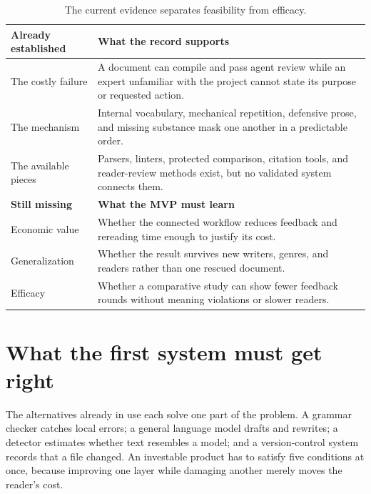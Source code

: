 \begin{table}[H]
\centering
\small
\begin{tabularx}{\textwidth}{@{}p{}L@{}}
\toprule
\textbf{Already established} & \textbf{What the record supports} \\
\midrule
The costly failure & A document can compile and pass agent review while an expert unfamiliar with the project cannot state its purpose or requested action. \\
The mechanism & Internal vocabulary, mechanical repetition, defensive prose, and missing substance mask one another in a predictable order. \\
The available pieces & Parsers, linters, protected comparison, citation tools, and reader-review methods exist, but no validated system connects them. \\
\midrule
\textbf{Still missing} & \textbf{What the MVP must learn} \\
\midrule
Economic value & Whether the connected workflow reduces feedback and rereading time enough to justify its cost. \\
Generalization & Whether the result survives new writers, genres, and readers rather than one rescued document. \\
Efficacy & Whether a comparative study can show fewer feedback rounds without meaning violations or slower readers. \\
\bottomrule
\end{tabularx}
\caption{The current evidence separates feasibility from efficacy.}
\label{tab:opening-status}
\end{table}

\section{What the first system must get right}

The alternatives already in use each solve one part of the problem. A grammar
checker catches local errors; a general language model drafts and rewrites; a
detector estimates whether text resembles a model; and a version-control
system records that a file changed. An investable product has to satisfy five
conditions at once, because improving one layer while damaging another merely
moves the reader's cost.

